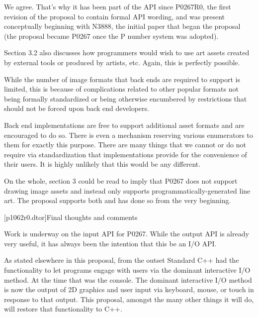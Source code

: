 \pnum
We agree. That's why it has been part of the API since P0267R0, the first revision of the proposal to contain formal API wording, and was present conceptually beginning with N3888, the initial paper that began the proposal (the proposal became P0267 once the P number system was adopted).

\pnum
Section 3.2 also discusses how programmers would wish to use art assets created by external tools or produced by artists, etc. Again, this is perfectly possible.

\pnum
While the number of image formats that back ends are required to support is limited, this is because of complications related to other popular formats not being formally standardized or being otherwise encumbered by restrictions that should not be forced upon back end developers.

\pnum
Back end implementations are free to support additional asset formats and are encouraged to do so. There is even a mechanism reserving various enumerators to them for exactly this purpose. There are many things that we cannot or do not require via standardization that implementations provide for the convenience of their users. It is highly unlikely that this would be any different.

\pnum
On the whole, section 3 could be read to imply that P0267 does not support drawing image assets and instead only supports programmatically-generated line art. The proposal supports both and has done so from the very beginning.

[p1062r0.dtor]{Final thoughts and comments}

\pnum
Work is underway on the input API for P0267. While the output API is already very useful, it has always been the intention that this be an I/O API.

\pnum
As stated elsewhere in this proposal, from the outset Standard C++ had the functionality to let programs engage with users via the dominant interactive I/O method. At the time that was the console. The dominant interactive I/O method is now the output of 2D graphics and user input via keyboard, mouse, or touch in response to that output. This proposal, amongst the many other things it will do, will restore that functionality to C++.

